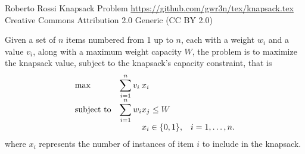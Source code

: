 \begin{copyleft}
{Roberto Rossi}                                        %
{Knapsack Problem}                                     %
{\url{https://github.com/gwr3n/tex/knapsack.tex}}      %
{Creative Commons Attribution 2.0 Generic (CC BY 2.0)} %

Given a set of $n$ items numbered from 1 up to $n$, 
each with a weight $w_i$ and a value $v_i$, 
along with a maximum weight capacity $W$, the problem 
is to maximize the knapsack value, subject to the 
knapsack's capacity constraint, that is 
\[
\begin{array}{ll@{}ll}
\mathrm{max}        & \displaystyle\sum\limits_{i=1}^{n} v_{i}&x_{i} &\\
\mathrm{subject~to} & \displaystyle\sum\limits_{i=1}^{n} w_{i}&x_{j} \leq W\\
                    &                                        
                    &x_{i} \in \{0,1\}, &i=1 ,\dots, n.
\end{array}
\]
where $x_{i}$ represents the number of instances of item $i$ 
to include in the knapsack.

\end{copyleft}